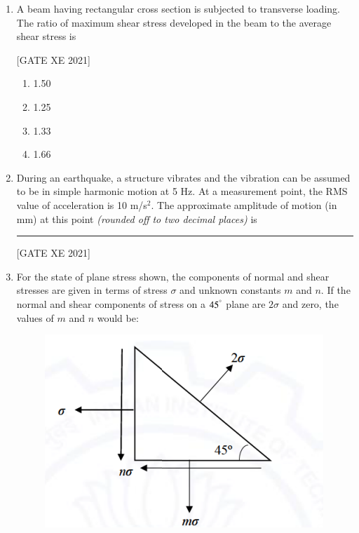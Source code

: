 \documentclass[journal,12pt,onecolumn]{IEEEtran}
\theoremstyle{remark}
\begin{document}
\begin{enumerate}[resume]
\hfill[GATE XE 2021]

\begin{multicols}{2}
\begin{enumerate}
\item $P/4$
\item $8P/3$
\item $4P/3$
\item $P/3$
\end{enumerate}
\end{multicols}

\item A beam having rectangular cross section is subjected to transverse loading. The ratio of maximum shear stress developed in the beam to the average shear stress is

\hfill[GATE XE 2021]

\begin{multicols}{2}
\begin{enumerate}
\item 1.50
\item 1.25
\item 1.33
\item 1.66
\end{enumerate}
\end{multicols}

\item During an earthquake, a structure vibrates and the vibration can be assumed to be in simple harmonic motion at 5 Hz. At a measurement point, the RMS value of acceleration is 10 m/s$^2$. The approximate amplitude of motion (in mm) at this point \emph{(rounded off to two decimal places)} is \rule{3cm}{0.4pt}

\hfill[GATE XE 2021]

\item For the state of plane stress shown, the components of normal and shear stresses are given in terms of stress $\sigma$ and unknown constants $m$ and $n$. If the normal and shear components of stress on a $45^\degree$ plane are $2\sigma$ and zero, the values of $m$ and $n$ would be:

\begin{figure}[H]
      \centering
      \includegraphics[width=0.5\columnwidth]{figs/fig21.png}
      \caption{}
      \label{fig:placeholder}
  \end{figure}


\end{enumerate}
\end{document}

